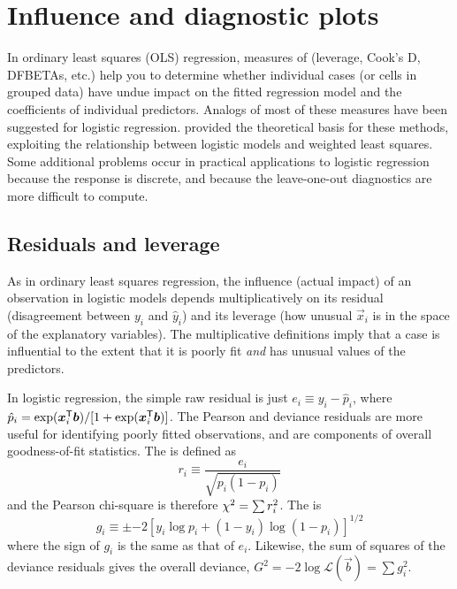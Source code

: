 \section{Influence and diagnostic plots}\label{sec:logist-infl}

In ordinary least squares (OLS) regression, measures of 
(leverage, Cook's D, DFBETAs, etc.) help you to determine whether
individual cases (or cells in grouped data)
have undue impact on the fitted regression model and
the coefficients of individual predictors.
Analogs of most of these
measures have been suggested for logistic regression.
\citet{Pregibon:81} provided the theoretical basis for these methods,
exploiting the relationship between logistic models and
weighted least squares.  Some
additional problems occur in practical applications to
logistic regression because the response
is discrete, and because the leave-one-out diagnostics are more
difficult to compute.

\subsection{Residuals and leverage}
As in ordinary least squares regression, the influence (actual impact)
of an observation in logistic models depends multiplicatively
on its residual (disagreement between $y_i$ and $\hat{y}_i$)
and its leverage (how unusual $\vec{x}_i$ is in the space of the
explanatory variables).
The multiplicative definitions imply that a case is influential to
the extent that it is poorly fit \emph{and} has unusual values of
the predictors.

In logistic regression, the simple raw residual is just $e_i \equiv y_i - \hat{p}_i$,
where $ \hat{p}_i = \exp( \bm{x}_i^\mathsf{T} \bm{b} ) / [1 + \exp( \bm{x}_i^\mathsf{T} \bm{b} )]$.
The  Pearson and deviance residuals are more useful for identifying
poorly fitted observations, and are components of overall goodness-of-fit
statistics.
The  is defined as
\begin{equation}\label{eq:reschi}
r_i \equiv \frac{e_i}{\sqrt{ p_i  (1-p_i)}}
\end{equation}
and the Pearson chi-square is therefore $\chi^2 = \sum r_i^2$.
The  is
\begin{equation}\label{eq:resdev}
g_i \equiv \pm { -2 [ y_i \log p_i  + (1-y_i) \log (1-p_i) ] }^{1/2}
\end{equation}
where the sign of $g_i$ is the same as that of $e_i$.
Likewise, the sum of squares of the deviance residuals gives
the overall deviance,
$G^2 = -2 \log \mathcal{L}(\vec{b}) = \sum g_i^2$.

